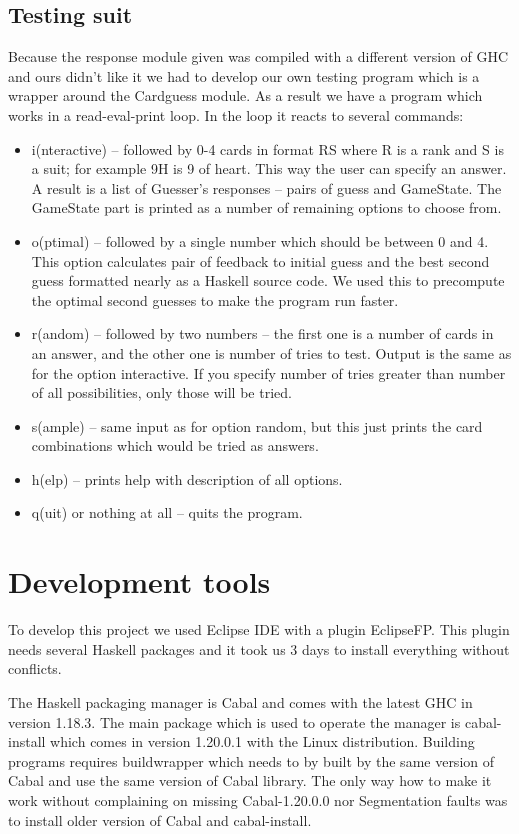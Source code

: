 \documentclass{article}
\begin{document}
\subsection{Testing suit}

Because the response module given was compiled with a different version of GHC and ours didn't like it we had to develop our own testing program which is a wrapper around the Cardguess module.
As a result we have a program which works in a read-eval-print loop.
In the loop it reacts to several commands:
\begin{itemize}
\item i(nteractive) -- followed by 0-4 cards in format RS where R is a rank and S is a suit; for example 9H is 9 of heart.
	This way the user can specify an answer.
	A result is a list of Guesser's responses -- pairs of guess and GameState.
	The GameState part is printed as a number of remaining options to choose from.
\item o(ptimal) -- followed by a single number which should be between 0 and 4.
	This option calculates pair of feedback to initial guess and the best second guess formatted nearly as a Haskell source code.
	We used this to precompute the optimal second guesses to make the program run faster.
\item r(andom) -- followed by two numbers -- the first one is a number of cards in an answer, and the other one is number of tries to test.
	Output is the same as for the option interactive.
	If you specify number of tries greater than number of all possibilities, only those will be tried.
\item s(ample) -- same input as for option random, but this just prints the card combinations which would be tried as answers.
\item h(elp) -- prints help with description of all options.
\item q(uit) or nothing at all -- quits the program.
\end{itemize}

\section{Development tools}

To develop this project we used Eclipse IDE with a plugin EclipseFP.
This plugin needs several Haskell packages and it took us 3 days to install everything without conflicts.

The Haskell packaging manager is Cabal and comes with the latest GHC in version 1.18.3.
The main package which is used to operate the manager is cabal-install which comes in version 1.20.0.1 with the Linux distribution.
Building programs requires buildwrapper which needs to by built by the same version of Cabal and use the same version of Cabal library.
The only way how to make it work without complaining on missing Cabal-1.20.0.0 nor Segmentation faults was to install older version of Cabal and cabal-install.
\end{document}
